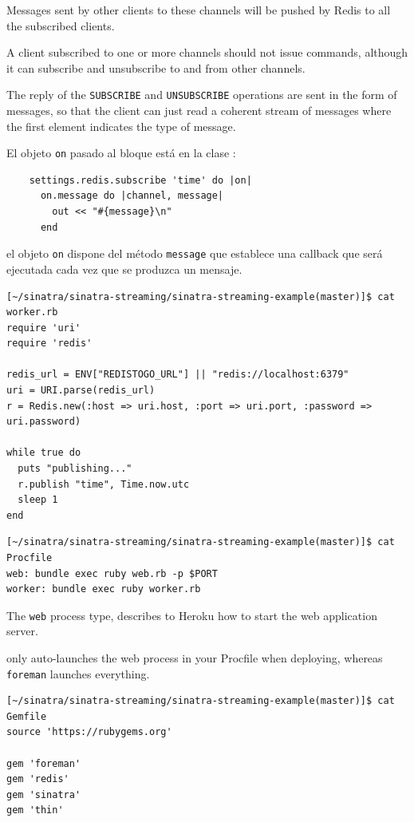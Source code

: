 Messages sent by other clients to these channels will be pushed by
Redis to all the subscribed clients.

A client subscribed to one or more channels should not issue commands,
although it can subscribe and unsubscribe to and from other channels.

The reply of the \verb|SUBSCRIBE| and \verb|UNSUBSCRIBE| operations are sent in
the form of messages, so that the client can just read a coherent
stream of messages where the first element indicates the type of
message.

El objeto \verb|on| pasado al bloque está en la clase
:
\begin{verbatim}
    settings.redis.subscribe 'time' do |on|
      on.message do |channel, message|
        out << "#{message}\n"
      end
\end{verbatim}
el objeto \verb|on| dispone del método \verb|message| que establece una callback
que será ejecutada cada vez que se produzca un mensaje.

\begin{verbatim}
[~/sinatra/sinatra-streaming/sinatra-streaming-example(master)]$ cat worker.rb 
require 'uri'
require 'redis'

redis_url = ENV["REDISTOGO_URL"] || "redis://localhost:6379"
uri = URI.parse(redis_url)
r = Redis.new(:host => uri.host, :port => uri.port, :password => uri.password)

while true do
  puts "publishing..."
  r.publish "time", Time.now.utc
  sleep 1  
end
\end{verbatim}

\begin{verbatim}
[~/sinatra/sinatra-streaming/sinatra-streaming-example(master)]$ cat Procfile 
web: bundle exec ruby web.rb -p $PORT
worker: bundle exec ruby worker.rb
\end{verbatim}
The \verb|web| process type, describes to Heroku how to start the web application server.

only auto-launches
the web process in your Procfile when deploying, whereas \verb|foreman|
launches everything. 

\begin{verbatim}
[~/sinatra/sinatra-streaming/sinatra-streaming-example(master)]$ cat Gemfile
source 'https://rubygems.org'

gem 'foreman'
gem 'redis'
gem 'sinatra'
gem 'thin'
\end{verbatim}

